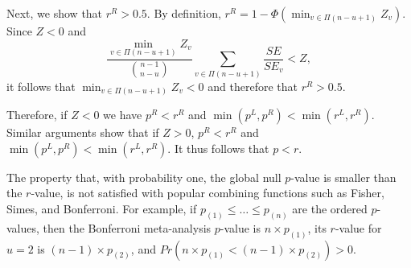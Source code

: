 \documentclass[useAMS,usenatbib,referee]{biom}
\theoremstyle{plain}
\begin{document}
	Next, we show that $r^R>0.5$. By definition,  $r^R = 1- \Phi(\min_{v\in\Pi(n-u+1)} Z_v)$. Since $Z<0$ and  
	$$\frac{\min_{v\in\Pi(n-u+1)} Z_v}{\binom{n-1}{n-u}}\sum_{v\in \Pi(n-u+1)} \frac{SE}{SE_v}<Z, $$ it follows that $\min_{v\in\Pi(n-u+1)} Z_v<0$ and therefore that $r^R>0.5$. 
	
	
	
	Therefore, if $Z<0$ we have $p^R<r^R$ and $\min(p^L,p^R)<\min(r^L,r^R)$. 
	Similar arguments show that if $Z>0$, $p^R<r^R$ and  $\min(p^L,p^R)<\min(r^L,r^R)$. It thus follows that $p<r$. 
	
	\begin{remark}
		The property that, with probability one,  the global null $p$-value is smaller than the $r$-value, is not satisfied with popular combining functions such as Fisher, Simes, and Bonferroni. 
		For example, if $p_{(1)}\leq \ldots \leq p_{(n)}$ are the ordered $p$-values, then the Bonferroni meta-analysis $p$-value is $n\times p_{(1)}$, its $r$-value for $u=2$ is $(n-1)\times p_{(2)}$, and $Pr \left(n\times p_{(1)}<(n-1)\times p_{(2)}\right)>0. $ 
	\end{remark}
	
	
\end{document}
